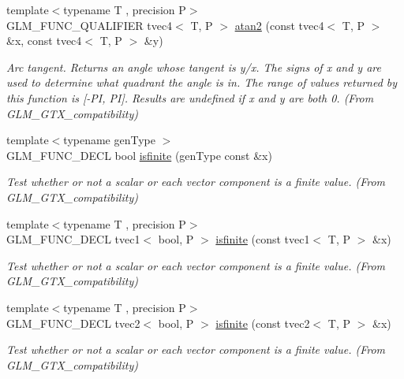 \begin{DoxyCompactItemize}
{\footnotesize template$<$typename T , precision P$>$ }\\G\+L\+M\+\_\+\+F\+U\+N\+C\+\_\+\+Q\+U\+A\+L\+I\+F\+I\+E\+R tvec4$<$ T, P $>$ \hyperlink{group__gtx__compatibility_ga09d39c391a509a045b6c7061f15bdff5}{atan2} (const tvec4$<$ T, P $>$ \&x, const tvec4$<$ T, P $>$ \&y)
\begin{DoxyCompactList}\small\item\em Arc tangent. Returns an angle whose tangent is y/x. The signs of x and y are used to determine what quadrant the angle is in. The range of values returned by this function is \mbox{[}-\/\+P\+I, P\+I\mbox{]}. Results are undefined if x and y are both 0. (From G\+L\+M\+\_\+\+G\+T\+X\+\_\+compatibility) \end{DoxyCompactList}\item 
{\footnotesize template$<$typename gen\+Type $>$ }\\G\+L\+M\+\_\+\+F\+U\+N\+C\+\_\+\+D\+E\+C\+L bool \hyperlink{group__gtx__compatibility_gaf4b04dcd3526996d68c1bfe17bfc8657}{isfinite} (gen\+Type const \&x)
\begin{DoxyCompactList}\small\item\em Test whether or not a scalar or each vector component is a finite value. (From G\+L\+M\+\_\+\+G\+T\+X\+\_\+compatibility) \end{DoxyCompactList}\item 
{\footnotesize template$<$typename T , precision P$>$ }\\G\+L\+M\+\_\+\+F\+U\+N\+C\+\_\+\+D\+E\+C\+L tvec1$<$ bool, P $>$ \hyperlink{group__gtx__compatibility_ga553e2e95b06a0f70c718605998889d3b}{isfinite} (const tvec1$<$ T, P $>$ \&x)
\begin{DoxyCompactList}\small\item\em Test whether or not a scalar or each vector component is a finite value. (From G\+L\+M\+\_\+\+G\+T\+X\+\_\+compatibility) \end{DoxyCompactList}\item 
{\footnotesize template$<$typename T , precision P$>$ }\\G\+L\+M\+\_\+\+F\+U\+N\+C\+\_\+\+D\+E\+C\+L tvec2$<$ bool, P $>$ \hyperlink{group__gtx__compatibility_ga7dd492aa7d6ec21715f9a91b6e5e596a}{isfinite} (const tvec2$<$ T, P $>$ \&x)
\begin{DoxyCompactList}\small\item\em Test whether or not a scalar or each vector component is a finite value. (From G\+L\+M\+\_\+\+G\+T\+X\+\_\+compatibility) \end{DoxyCompactList}\item 

\end{DoxyCompactItemize}
